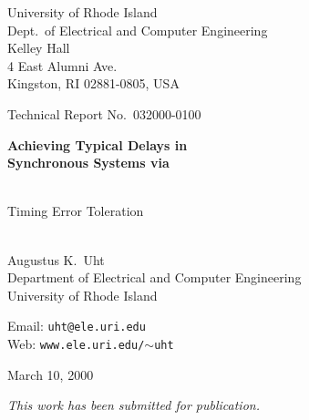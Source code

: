 \documentclass[12pt,dvips]{article}
\begin{document}
\begin{spacing}{1}



\noindent

{\large University of Rhode Island\\

Dept.\ of Electrical and Computer Engineering\\

Kelley Hall\\

4 East Alumni Ave.\\

Kingston, RI 02881-0805, USA\\}

\vspace{0.15in}



\noindent

{\Large Technical Report No.\ 032000-0100}

\vspace{0.30in}





\begin{center}

{\LARGE \bf Achieving Typical Delays in\\

Synchronous Systems via

\vspace{0.05in}\\

Timing Error Toleration}

\vspace{0.15in}\\

Augustus K.\ Uht \\

Department of Electrical and Computer Engineering\\

University of Rhode Island\\

\vspace{0.1in}

Email: {\tt uht@ele.uri.edu}\\

Web: {\tt www.ele.uri.edu/$\sim$uht}\\

\vspace{0.1in}

March 10, 2000 \\

\vspace{0.1in}

{\it This work has been submitted for publication.}\\



\end{center}



\end{spacing}
\end{document}
